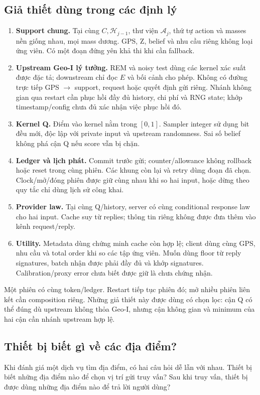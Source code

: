 \subsection{Giả thiết dùng trong các định lý}\label{sec:assumptions}
\begin{enumerate}[label=\textbf{A\arabic*.}]
\item \textbf{Support chung.} Tại cùng $C,\mathcal H_{j-1}$, thư viện $\mathcal A_j$, thứ tự action và
masses nền giống nhau, mọi mass dương. GPS, Z, belief và nhu cầu riêng không loại ứng viên. Có một
đoạn đứng yên khả thi khi cần fallback.
\item \textbf{Upstream Geo-I lý tưởng.} REM và noisy test dùng các kernel xác suất được đặc tả;
downstream chỉ đọc $E$ và bối cảnh cho phép. Không có đường trực tiếp GPS $\rightarrow$ support,
request hoặc quyết định gửi riêng. Nhánh không gian qua restart cần phục hồi đầy đủ history, chi phí
và RNG state; khớp timestamp/config chưa đủ xác nhận việc phục hồi đó.
\item \textbf{Kernel Q.} Điểm vào kernel nằm trong $[0,1]$. Sampler integer sử dụng bit đều mới,
độc lập với private input và upstream randomness. Sai số belief không phá cận Q nếu score vẫn bị chặn.
\item \textbf{Ledger và lịch phát.} Commit trước gửi; counter/allowance không rollback hoặc reset
trong cùng phiên. Các khung còn lại và retry dùng đoạn đã chọn. Clock/mở/đóng phiên được giữ cùng
nhau khi so hai input, hoặc dừng theo quy tắc chỉ dùng lịch sử công khai.
\item \textbf{Provider law.} Tại cùng Q/history, server có cùng conditional response law cho hai
input. Cache suy từ replies; thông tin riêng không được đưa thêm vào kênh request/reply.
\item \textbf{Utility.} Metadata dùng chứng minh cache còn hợp lệ; client dùng cùng GPS, nhu cầu và
total order khi so các tập ứng viên. Muốn dùng floor từ reply signatures, batch nhận được phải đầy đủ
và khớp signatures. Calibration/proxy error chưa biết được giữ là chưa chứng nhận.
\end{enumerate}

Một phiên có cùng token/ledger. Restart tiếp tục phiên đó; mở nhiều phiên liên kết cần composition
riêng. Những giả thiết này được dùng có chọn lọc: cận Q có thể đúng dù upstream không thỏa Geo-I,
nhưng cận không gian và minimum của hai cận cần nhánh upstream hợp lệ.

\subsection{Thiết bị biết gì về các địa điểm?}\label{sec:data-access}
Khi đánh giá một dịch vụ tìm địa điểm, có hai câu hỏi dễ lẫn với nhau. Thiết bị biết những địa điểm nào để chọn vị trí gửi truy vấn? Sau khi truy vấn, thiết bị được dùng những địa điểm nào để trả lời người dùng?

